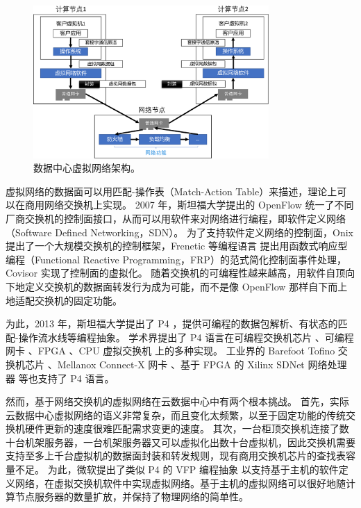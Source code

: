 \begin{figure}[htbp]
	\centering
	\includegraphics[width=0.8\textwidth]{figures/VPC_arch.pdf}
	\caption{数据中心虚拟网络架构。}
	\label{background:fig:network-architecture}
\end{figure}


虚拟网络的数据面可以用匹配-操作表（Match-Action Table）来描述，理论上可以在商用网络交换机上实现。
2007 年，斯坦福大学提出的 OpenFlow \cite{mckeown2008openflow} 统一了不同厂商交换机的控制面接口，从而可以用软件来对网络进行编程，即软件定义网络（Software Defined Networking，SDN）。
为了支持软件定义网络的控制面，Onix \cite{koponen2010onix} 提出了一个大规模交换机的控制框架，Frenetic 等编程语言 \cite{voellmy2010nettle,foster2011frenetic} 提出用函数式响应型编程（Functional Reactive Programming，FRP）的范式简化控制面事件处理，Covisor \cite{jin2015covisor} 实现了控制面的虚拟化。
随着交换机的可编程性越来越高，用软件自顶向下地定义交换机的数据面转发行为成为可能，而不是像 OpenFlow 那样自下而上地适配交换机的固定功能。

为此，2013 年，斯坦福大学提出了 P4 \cite{bosshart2014p4}，提供可编程的数据包解析、有状态的匹配-操作流水线等编程抽象。
学术界提出了 P4 语言在可编程交换机芯片 \cite{bosshart2013forwarding}、可编程网卡 \cite{kaufmann2016high}、FPGA \cite{wang2017p4fpga}、CPU 虚拟交换机 \cite{shahbaz2016pisces} 上的多种实现。
工业界的 Barefoot Tofino 交换机芯片 \cite{barefoot-tofino}、Mellanox Connect-X 网卡 \cite{mellanox}、基于 FPGA 的 Xilinx SDNet 网络处理器 \cite{xilinx-p4} 等也支持了 P4 语言。

然而，基于网络交换机的虚拟网络在云数据中心中有两个根本挑战。
首先，实际云数据中心虚拟网络的语义非常复杂，而且变化太频繁，以至于固定功能的传统交换机硬件更新的速度很难匹配需求变更的速度。
其次，一台柜顶交换机连接了数十台机架服务器，一台机架服务器又可以虚拟化出数十台虚拟机，因此交换机需要支持至多上千台虚拟机的数据面封装和转发规则，现有商用交换机芯片的查找表容量不足。
为此，微软提出了类似 P4 的 VFP 编程抽象 \cite{firestone2017vfp} 以支持基于主机的软件定义网络，在虚拟交换机软件中实现虚拟网络。基于主机的虚拟网络可以很好地随计算节点服务器的数量扩放，并保持了物理网络的简单性。

